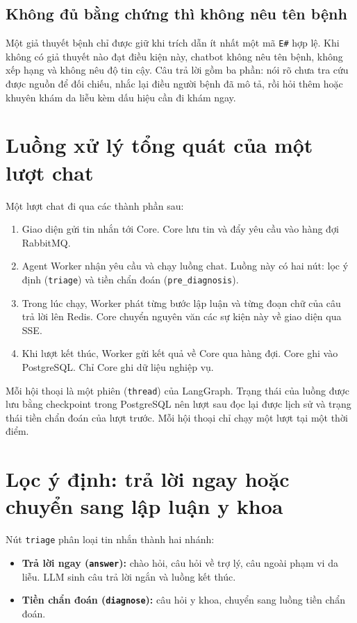 \subsection{Không đủ bằng chứng thì không nêu tên bệnh}
\label{sec:thieu-bang-chung}

Một giả thuyết bệnh chỉ được giữ khi trích dẫn ít nhất một mã \texttt{E\#} hợp lệ. Khi không có giả thuyết nào đạt điều kiện này, chatbot không nêu tên bệnh, không xếp hạng và không nêu độ tin cậy. Câu trả lời gồm ba phần: nói rõ chưa tra cứu được nguồn để đối chiếu, nhắc lại điều người bệnh đã mô tả, rồi hỏi thêm hoặc khuyên khám da liễu kèm dấu hiệu cần đi khám ngay.

\section{Luồng xử lý tổng quát của một lượt chat}

Một lượt chat đi qua các thành phần sau:
\begin{enumerate}
  \item Giao diện gửi tin nhắn tới Core. Core lưu tin và đẩy yêu cầu vào hàng đợi RabbitMQ.
  \item Agent Worker nhận yêu cầu và chạy luồng chat. Luồng này có hai nút: lọc ý định (\texttt{triage}) và tiền chẩn đoán (\texttt{pre\_diagnosis}).
  \item Trong lúc chạy, Worker phát từng bước lập luận và từng đoạn chữ của câu trả lời lên Redis. Core chuyển nguyên văn các sự kiện này về giao diện qua SSE.
  \item Khi lượt kết thúc, Worker gửi kết quả về Core qua hàng đợi. Core ghi vào PostgreSQL. Chỉ Core ghi dữ liệu nghiệp vụ.
\end{enumerate}

Mỗi hội thoại là một phiên (\texttt{thread}) của LangGraph. Trạng thái của luồng được lưu bằng checkpoint trong PostgreSQL nên lượt sau đọc lại được lịch sử và trạng thái tiền chẩn đoán của lượt trước. Mỗi hội thoại chỉ chạy một lượt tại một thời điểm.

\section{Lọc ý định: trả lời ngay hoặc chuyển sang lập luận y khoa}

Nút \texttt{triage} phân loại tin nhắn thành hai nhánh:
\begin{itemize}
  \item \textbf{Trả lời ngay (\texttt{answer}):} chào hỏi, câu hỏi về trợ lý, câu ngoài phạm vi da liễu. LLM sinh câu trả lời ngắn và luồng kết thúc.
  \item \textbf{Tiền chẩn đoán (\texttt{diagnose}):} câu hỏi y khoa, chuyển sang luồng tiền chẩn đoán.
\end{itemize}

